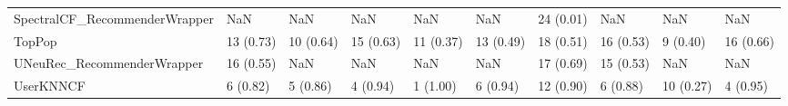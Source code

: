 \begin{tabular}{llllllllll}
      SpectralCF\_RecommenderWrapper &                      NaN &         NaN &           NaN &          NaN &                  NaN &           24 (0.01) &               NaN &                NaN &               NaN \\
                             TopPop &                13 (0.73) &   10 (0.64) &     15 (0.63) &    11 (0.37) &            13 (0.49) &           18 (0.51) &         16 (0.53) &           9 (0.40) &         16 (0.66) \\
         UNeuRec\_RecommenderWrapper &                16 (0.55) &         NaN &           NaN &          NaN &                  NaN &           17 (0.69) &         15 (0.53) &                NaN &               NaN \\
                          UserKNNCF &                 6 (0.82) &    5 (0.86) &      4 (0.94) &     1 (1.00) &             6 (0.94) &           12 (0.90) &          6 (0.88) &          10 (0.27) &          4 (0.95) \\
\bottomrule
\end{tabular}
